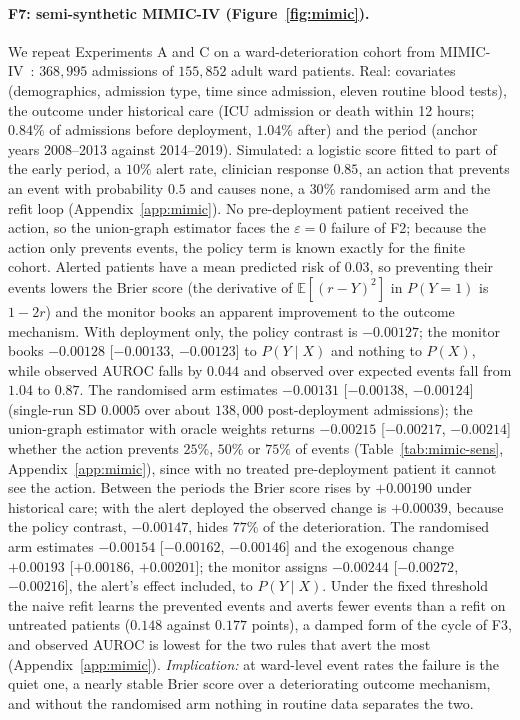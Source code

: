 \documentclass[letterpaper]{article} %
\newcommand{\E}{\mathbb{E}}
\begin{document}
\paragraph{F7: semi-synthetic MIMIC-IV (Figure~\ref{fig:mimic}).} We repeat
Experiments A and C on a ward-deterioration cohort from
MIMIC-IV~\citep{johnson2023mimic}: $368{,}995$ admissions of $155{,}852$
adult ward patients. Real: covariates (demographics, admission type, time
since admission, eleven routine blood tests), the outcome under historical
care (ICU admission or death within 12 hours; $0.84\%$ of admissions before
deployment, $1.04\%$ after) and the period (anchor years 2008--2013 against
2014--2019). Simulated: a logistic score fitted to part of the early period,
a $10\%$ alert rate, clinician response $0.85$, an action that prevents an
event with probability $0.5$ and causes none, a $30\%$ randomised arm and the
refit loop (Appendix~\ref{app:mimic}). No pre-deployment patient received the
action, so the union-graph estimator faces the $\varepsilon = 0$ failure of
F2; because the action only prevents events, the policy term is known exactly
for the finite cohort. Alerted patients have a mean predicted risk of $0.03$,
so preventing their events lowers the Brier score (the derivative of
$\E[(r - Y)^2]$ in $P(Y{=}1)$ is $1 - 2r$) and the monitor books an apparent
improvement to the outcome mechanism. With deployment only, the policy
contrast is $-0.00127$; the monitor books $-0.00128$ [$-0.00133$, $-0.00123$]
to $P(Y \mid X)$ and nothing to $P(X)$, while observed AUROC falls by $0.044$
and observed over expected events fall from $1.04$ to $0.87$. The randomised
arm estimates $-0.00131$ [$-0.00138$, $-0.00124$] (single-run SD $0.0005$
over about $138{,}000$ post-deployment admissions); the union-graph estimator
with oracle weights returns $-0.00215$ [$-0.00217$, $-0.00214$] whether the
action prevents $25\%$,
$50\%$ or $75\%$ of events (Table~\ref{tab:mimic-sens}, Appendix~\ref{app:mimic}),
since with no
treated pre-deployment patient it cannot see the action. Between the periods
the Brier score rises by $+0.00190$ under historical care; with the alert
deployed the observed change is $+0.00039$, because the policy contrast,
$-0.00147$, hides $77\%$ of the deterioration. The randomised arm estimates
$-0.00154$ [$-0.00162$, $-0.00146$] and the exogenous change $+0.00193$
[$+0.00186$, $+0.00201$]; the monitor assigns $-0.00244$ [$-0.00272$,
$-0.00216$], the alert's effect included, to $P(Y \mid X)$. Under the fixed
threshold the naive refit learns the prevented events and averts fewer events
than a refit on untreated patients ($0.148$ against $0.177$ points), a damped
form of the cycle of F3, and observed AUROC is lowest for the two rules
that avert the most (Appendix~\ref{app:mimic}).
\emph{Implication:} at ward-level event rates the failure is the quiet one,
a nearly stable Brier score over a deteriorating outcome mechanism, and
without the randomised arm nothing in routine data separates the two.
\end{document}
